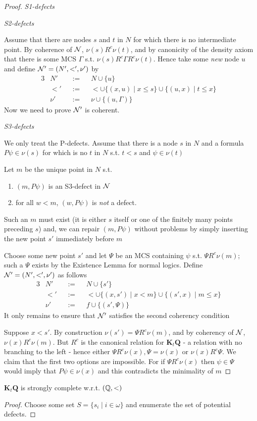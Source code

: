 \documentclass[11pt]{article}
\newcommand{\KtQ}{\textbf{K}_t\textbf{Q}}
\begin{document}
\begin{proof}
\emph{S1-defects}

\emph{S2-defects}

Assume that there are nodes \(s\) and \(t\) in \(N\) for which there is no
intermediate point. By coherence of \(\mathcal{N}\), \(\nu(s)R^c\nu(t)\), and by
canonicity of the density axiom that there is some MCS \(\Gamma\) s.t.
\(\nu(s)R^c\Gamma R^c\nu(t)\). Hence take some \emph{new} node \(u\) and define
\(\mathcal{N}'=(N',<',\nu')\) by
\begin{alignat*}{3}
&N'&&:=&&N\cup\{u\}\\
&<'&&:=&&<\cup\{(x,u)\mid x\le s\}\cup\{(u,x)\mid t\le x\}\\
&\nu'&&:=&&\nu\cup\{(u,\Gamma)\}
\end{alignat*}
Now we need to prove \(\mathcal{N}'\) is coherent.

\emph{S3-defects}

We only treat the P-defects. Assume that there is a node \(s\) in \(N\) and a
formula \(P\psi\in\nu(s)\)  for which is no \(t\) in \(N\) s.t. \(t<s\) and \(\psi\in\nu(t)\)

Let \(m\) be the unique point in \(N\) s.t.
\begin{enumerate}
\item \((m,P\psi)\) is an S3-defect in \(\mathcal{N}\)
\item for all \(w<m\), \((w,P\psi)\) is \emph{not} a defect.
\end{enumerate}


Such an \(m\) must exist (it is either \(s\) itself or one of the finitely
many points preceding \(s\)) and, we can repair \((m,P\psi)\) without
problems by simply inserting the new point \(s'\) immediately before \(m\)

Choose some new point \(s'\) and let \(\Psi\) be an MCS containing \(\psi\) s.t.
\(\Psi R^c \nu(m)\); such a \(\Psi\) exists by the Existence Lemma for normal logics.
Define \(\mathcal{N}'=(N',<',\nu')\) as follows
\begin{alignat*}{3}
&N'&&:=&&N\cup\{s'\}\\
&<'&&:=&&<\cup\{(x,s')\mid x<m\}\cup\{(s',x)\mid m\le x\}\\
&\nu'&&:=&&f\cup\{(s',\Psi)\}
\end{alignat*}
It only remains to ensure that \(\mathcal{N}'\) satisfies the second coherency
condition

Suppose \(x<s'\). By construction \(\nu(s')=\Psi R^c\nu(m)\), and by coherency
of \(\mathcal{N}\), \(\nu(x)R^c\nu(m)\). But \(R^c\) is the canonical relation for
\(\KtQ\) - a relation with no branching to the left - hence either \(\Psi
   R^c\nu(x),\Psi=\nu(x)\) or \(\nu(x)R^c\Psi\). We claim that the first two
options are impossible. For if \(\Psi R^c\nu(x)\) then \(\psi\in\Psi\) would
imply that \(P\psi\in\nu(x)\) and this contradicts the minimality of \(m\)
\end{proof}

\begin{theorem}[]
\(\KtQ\) is strongly complete w.r.t. \((\mathbb{Q},<)\)
\end{theorem}

\begin{proof}
Choose some set \(S=\{s_i\mid i\in\omega\}\) and enumerate the set of
potential defects.
\end{proof}
\end{document}
